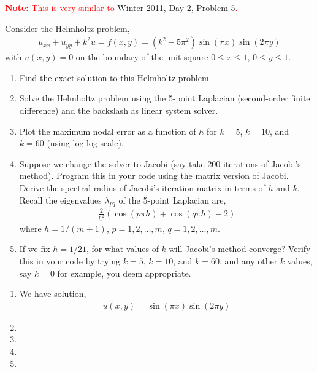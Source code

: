\documentclass[10pt]{article}
\newcommand{\note}[1]{\textcolor{red}{\textbf{Note:} #1}}
\begin{document}
\begin{problem}
    \note{This is very similar to \hyperref[Winter 2011, Day 2, Problem 5]{Winter 2011, Day 2, Problem 5}.}
    
    Consider the Helmholtz problem,
\begin{align*}
    u_{xx} + u_{yy} + k^2u = f(x,y) = (k^2-5\pi^2)\sin(\pi x)\sin(2\pi y)
\end{align*}
    with \( u(x,y) = 0 \) on the boundary of the unit square \( 0\leq x\leq 1 \), \( 0\leq y\leq 1 \).
\begin{enumerate}[nolistsep,label=(\alph*)]
    \item Find the exact solution to this Helmholtz problem.
    \item Solve the Helmholtz problem using the 5-point Laplacian (second-order finite difference) and the backslash as linear system solver.    
    \item Plot the maximum nodal error as a function of \( h \) for \( k=5 \), \( k=10 \), and \( k=60 \) (using log-log scale).
    \item Suppose we change the solver to Jacobi (say take 200 iterations of Jacobi’s method). Program this in your code using the matrix
        version of Jacobi. Derive the spectral radius of Jacobi’s iteration matrix in terms of \( h \) and \( k \). Recall the eigenvalues \( \lambda_{pq} \) of the 5-point Laplacian are,
        \begin{align*}
            \frac{2}{h^2} (\cos(p\pi h)+\cos(q \pi h)-2)
        \end{align*}
        where \( h=1/(m+1) \), \( p=1,2,\ldots,m \), \( q=1,2,\ldots,m \).
    \item If we fix \( h = 1/21 \), for what values of \( k \) will Jacobi’s method converge? Verify this in your code by trying \( k = 5 \), \( k = 10 \), and \( k = 60 \), and any other \( k \) values, say \( k = 0 \) for example, you deem appropriate.
\end{enumerate}

\end{problem}

\begin{solution}[Solution]
\begin{enumerate}[label=(\alph*)]
    \item We have solution,
        \begin{align*}
            u(x,y) = \sin(\pi x)\sin(2\pi y)
        \end{align*} 
    \item 
    \item 
    \item 
    \item 
\end{enumerate}
 
\end{solution}
\end{document}
